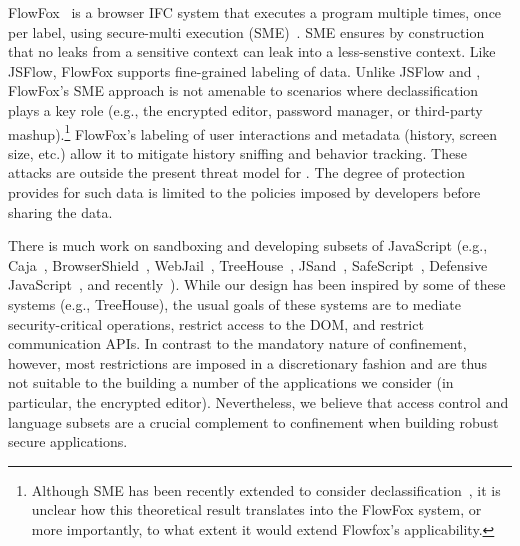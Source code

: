 FlowFox~\cite{DeGroef:2012} is a browser IFC system that executes a
program multiple times, once per label, using secure-multi execution
(SME)~\cite{Devriese:2010}. SME ensures by construction that no leaks
from a sensitive context can leak into a less-senstive context.
%
Like JSFlow, FlowFox supports fine-grained labeling of data.
%
Unlike JSFlow and \sys{}, FlowFox's SME approach is not amenable to
scenarios where declassification plays a key role (e.g., the encrypted
editor, password manager, or third-party mashup).\footnote{Although
  SME has been recently extended to consider
  declassification~\cite{Rafnsson:2013}, it is unclear how this
  theoretical result translates into the FlowFox system, or more
  importantly, to what extent it would extend Flowfox's applicability.}
%
FlowFox's labeling of user interactions and metadata (history, screen
size, etc.) allow it to mitigate history sniffing and behavior
tracking.
%
These attacks are outside the present threat model for \sys{}.  The
degree of protection \sys{} provides for such data is limited to the
policies imposed by developers before sharing the data.

%



There is much work on sandboxing and developing subsets of JavaScript (e.g.,
Caja~\cite{GoogleCaja}, BrowserShield~\cite{Reis:2007},
WebJail~\cite{VanAcker:2011}, TreeHouse~\cite{Ingram:2012},
JSand~\cite{Agten:2012:JCC}, SafeScript~\cite{SafeScript}, Defensive
JavaScript~\cite{djs}, and recently~\cite{Howell:2013}). 
%
While our design has been inspired by some of these systems (e.g.,
TreeHouse), the usual goals of these systems are to mediate
security-critical operations, restrict access to the DOM, and restrict
communication APIs\@.
%
In contrast to the mandatory nature of confinement, however, most restrictions
are imposed in a discretionary fashion and are thus not suitable to the
building a number of the applications we consider (in particular, the encrypted
editor).
%
Nevertheless, we believe that access control and language subsets are a crucial
complement to confinement when building robust secure applications.



